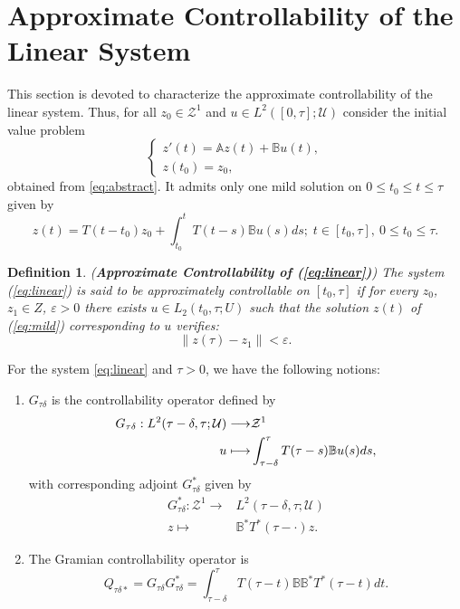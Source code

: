 \documentclass[11 pt]{amsart}
\newtheorem{definition}{\sc Definition}[section]
\begin{document}
\section{Approximate Controllability of the Linear System }\label{sec:lineal}
 This section is devoted to characterize the approximate controllability of the linear system. Thus,  for all $z_{0}\in {\mathcal{Z}}^{1}$ and $u\in
L^{2}([0,\tau];{\mathcal{U}})$ consider the initial value problem
\begin{equation}\label{eq:linear}
\left\{\begin{array}{lll}
    z'(t) = \mathbb{A} z(t) + {\mathbb{B}} u(t),\\
    z(t_{0}) = z_{0},
    \end{array}\right.
\end{equation}
obtained from \eqref{eq:abstract}. It admits only one mild solution on $0\leq t_{0}\leq t\leq \tau$ given by
\begin{equation}\label{eq:mild}
    z(t)=T(t-t_{0})z_{0} + \displaystyle\int_{t_{0}}^{t}T(t-s){\mathbb{B}} u(s)ds;\;t\in[t_{0},\tau],\:0\leq t_{0}\leq \tau.
\end{equation}
\begin{definition} \label{def2}
({\bf Approximate Controllability of (\ref{eq:linear})}) The system (\ref{eq:linear}) is said
to be approximately controllable on $[t_{0},\tau]$ if for every $z_0$,
$z_1\in Z$, $\varepsilon>0$ there exists $u\in L_{2}(t_{0},\tau;U)$ such
that the solution $z(t)$ of (\ref{eq:mild}) corresponding to $u$
verifies: $$\|z(\tau)-z_1\|<\varepsilon.$$
\end{definition}

For the system \eqref{eq:linear} and $\tau>0$, we have the following notions:
\begin{enumerate}
\item $G_{\tau\delta}$ is the controllability  operator defined by
\begin{eqnarray*}
G_{\tau\delta}: L^2(\tau-\delta,\tau;{\mathcal{U}}) \longrightarrow& {\mathcal{Z}}^{1}\\
u\longmapsto&{\displaystyle} \int_{\tau-\delta}^{\tau}T(\tau-s){\mathbb{B}} u(s)ds,
\end{eqnarray*}
with corresponding adjoint $G^*_{\tau\delta}$ given by
\begin{eqnarray*}
G^*_{\tau\delta}:  {\mathcal{Z}}^{1} \longrightarrow& L^2(\tau-\delta,\tau;{\mathcal{U}})\\
z\longmapsto& {\mathbb{B}} ^{*}T^{*}(\tau-\cdot)z.
\end{eqnarray*}
\item The Gramian controllability operator is
\begin{equation*}
Q_{\tau \delta*} = G_{\tau\delta}G_{\tau\delta}^{*}= \int_{\tau-\delta}^{\tau}T(\tau-t){\mathbb{B}} {\mathbb{B}} ^{*}T^{*}(\tau-t)dt.
\end{equation*}
\end{enumerate}
\end{document}

